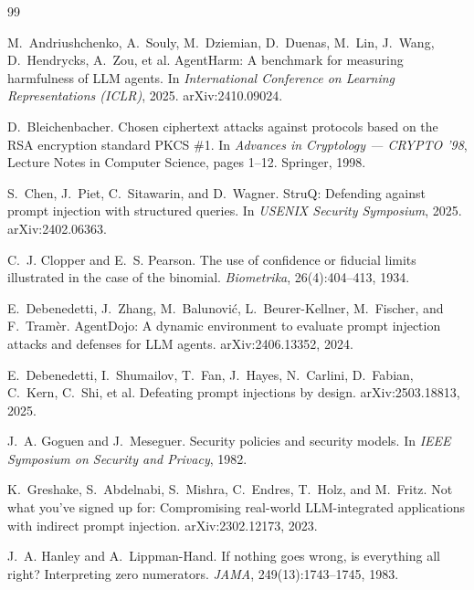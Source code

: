 \documentclass[11pt,oneside]{report}
\begin{document}
\begin{thebibliography}{99}

M.~Andriushchenko, A.~Souly, M.~Dziemian, D.~Duenas, M.~Lin, J.~Wang,
D.~Hendrycks, A.~Zou, et al.
\newblock AgentHarm: A benchmark for measuring harmfulness of {LLM} agents.
\newblock In \emph{International Conference on Learning Representations
  (ICLR)}, 2025. arXiv:2410.09024.

D.~Bleichenbacher.
\newblock Chosen ciphertext attacks against protocols based on the {RSA}
  encryption standard {PKCS} \#1.
\newblock In \emph{Advances in Cryptology --- CRYPTO '98}, Lecture Notes in
  Computer Science, pages 1--12. Springer, 1998.

S.~Chen, J.~Piet, C.~Sitawarin, and D.~Wagner.
\newblock StruQ: Defending against prompt injection with structured queries.
\newblock In \emph{USENIX Security Symposium}, 2025. arXiv:2402.06363.

C.~J. Clopper and E.~S. Pearson.
\newblock The use of confidence or fiducial limits illustrated in the case of
  the binomial.
\newblock \emph{Biometrika}, 26(4):404--413, 1934.

E.~Debenedetti, J.~Zhang, M.~Balunovi\'c, L.~Beurer-Kellner, M.~Fischer, and
  F.~Tram\`er.
\newblock AgentDojo: A dynamic environment to evaluate prompt injection attacks
  and defenses for {LLM} agents.
\newblock arXiv:2406.13352, 2024.

E.~Debenedetti, I.~Shumailov, T.~Fan, J.~Hayes, N.~Carlini, D.~Fabian,
  C.~Kern, C.~Shi, et al.
\newblock Defeating prompt injections by design.
\newblock arXiv:2503.18813, 2025.

J.~A. Goguen and J.~Meseguer.
\newblock Security policies and security models.
\newblock In \emph{IEEE Symposium on Security and Privacy}, 1982.

K.~Greshake, S.~Abdelnabi, S.~Mishra, C.~Endres, T.~Holz, and M.~Fritz.
\newblock Not what you've signed up for: Compromising real-world
  {LLM}-integrated applications with indirect prompt injection.
\newblock arXiv:2302.12173, 2023.

J.~A. Hanley and A.~Lippman-Hand.
\newblock If nothing goes wrong, is everything all right? {I}nterpreting zero
  numerators.
\newblock \emph{JAMA}, 249(13):1743--1745, 1983.


\end{thebibliography}
\end{document}
